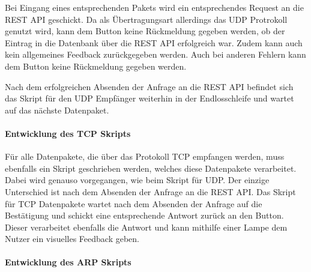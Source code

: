 Bei Eingang eines entsprechenden Pakets wird ein entsprechendes Request an die \ac{REST} \ac{API} geschickt. Da als Übertragungsart allerdings das UDP Protrokoll genutzt wird, kann dem Button keine Rückmeldung gegeben werden, ob der Eintrag in die Datenbank über die \ac{REST} \ac{API} erfolgreich war. Zudem kann auch kein allgemeines Feedback zurückgegeben werden. Auch bei anderen Fehlern kann dem Button keine Rückmeldung gegeben werden. 

Nach dem erfolgreichen Absenden der Anfrage an die \ac{REST} \ac{API} befindet sich das Skript für den \ac{UDP} Empfänger weiterhin in der Endlosschleife und wartet auf das nächste Datenpaket. 

\paragraph{Entwicklung des TCP Skripts}$\;$ \\  
\label{sec:Entwicklung des TCP Skripts-1} 
Für alle Datenpakete, die über das Protokoll \ac{TCP} empfangen werden, muss ebenfalls ein Skript geschrieben werden, welches diese Datenpakete verarbeitet. Dabei wird genauso vorgegangen, wie beim Skript für UDP. Der einzige Unterschied ist nach dem Absenden der Anfrage an die \ac{REST} \ac{API}. Das Skript für \ac{TCP} Datenpakete wartet nach dem Absenden der Anfrage auf die Bestätigung und schickt eine entsprechende Antwort zurück an den Button. Dieser verarbeitet ebenfalls die Antwort und kann mithilfe einer Lampe dem Nutzer ein visuelles Feedback geben. 

\paragraph{Entwicklung des ARP Skripts}$\;$ \\  
\label{sec:Entwicklung des ARP Skripts-1} 
